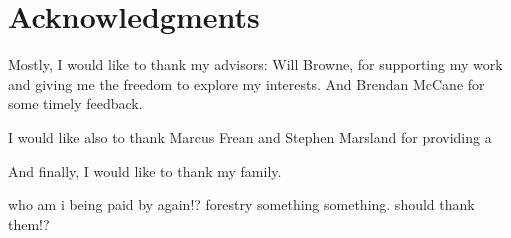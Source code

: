\chapter*{Acknowledgments}\label{C:ack}

Mostly, I would like to thank my advisors: Will Browne, for supporting my work and giving me the freedom to explore my interests.
And Brendan McCane for some timely feedback.

I would like also to thank Marcus Frean and Stephen Marsland for providing a

And finally, I would like to thank my family.

{\color{red}who am i being paid by again!? forestry something something. should thank them!?}


